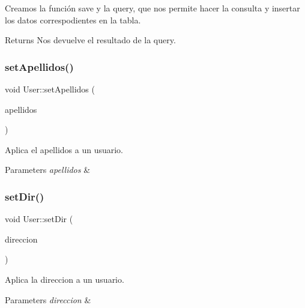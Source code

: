 Creamos la función save y la query, que nos permite hacer la consulta y insertar los datos correspodientes en la tabla. 

\begin{DoxyReturn}{Returns}
Nos devuelve el resultado de la query. 
\end{DoxyReturn}
\mbox{\label{classUser_a3bff682a17f1b65cfedd9a5e1bb2acde}} 
\subsubsection{\texorpdfstring{set\+Apellidos()}{setApellidos()}}
{\footnotesize\ttfamily void User\+::set\+Apellidos (\begin{DoxyParamCaption}\item[{Q\+String}]{apellidos }\end{DoxyParamCaption})}



Aplica el apellidos a un usuario. 


\begin{DoxyParams}{Parameters}
{\em apellidos} & \\
\hline
\end{DoxyParams}
\mbox{\label{classUser_a4b9aee0b43928b561f11d95299af370b}} 
\subsubsection{\texorpdfstring{set\+Dir()}{setDir()}}
{\footnotesize\ttfamily void User\+::set\+Dir (\begin{DoxyParamCaption}\item[{Q\+String}]{direccion }\end{DoxyParamCaption})}



Aplica la direccion a un usuario. 


\begin{DoxyParams}{Parameters}
{\em direccion} & \\
\hline
\end{DoxyParams}
\mbox{\label{classUser_aa027aa9e931621418c045c6680b9461f}} 
